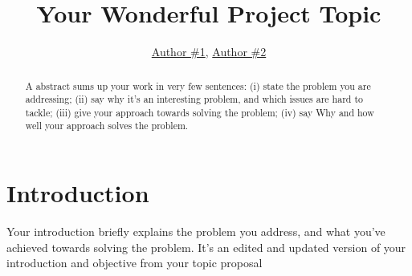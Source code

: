 \documentclass{article}
\title{Your Wonderful Project Topic}
\author{\href{mailto:author1@nyu.edu}{Author \#1}, \href{mailto:author2@nyu.edu}{Author \#2}}
\date{\vspace{-5ex}} %
\begin{document}
\maketitle
\thispagestyle{firstpage}


\begin{abstract}
    A abstract sums up your work in very few sentences:
    (i) state the problem you are addressing;
    (ii) say why it’s an interesting problem, and which issues are hard to tackle; 
    (iii) give your approach towards solving the problem; 
    (iv) say Why and how well your approach solves the problem.
\end{abstract}


\section*{Introduction}

Your introduction briefly explains the problem you address, and what you’ve achieved towards solving the problem. It’s an edited and updated version of your introduction and objective from your topic proposal
\end{document}
